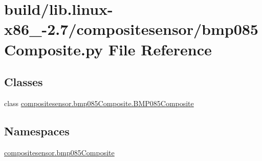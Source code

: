 \hypertarget{build_2lib_8linux-x86__64-2_87_2compositesensor_2bmp085Composite_8py}{}\section{build/lib.linux-\/x86\+\_-\/2.7/compositesensor/bmp085\+Composite.py File Reference}
\label{build_2lib_8linux-x86__64-2_87_2compositesensor_2bmp085Composite_8py}
\subsection*{Classes}
\begin{DoxyCompactItemize}
\item 
class \hyperlink{classcompositesensor_1_1bmp085Composite_1_1BMP085Composite}{compositesensor.\+bmp085\+Composite.\+B\+M\+P085\+Composite}
\end{DoxyCompactItemize}
\subsection*{Namespaces}
\begin{DoxyCompactItemize}
\item 
 \hyperlink{namespacecompositesensor_1_1bmp085Composite}{compositesensor.\+bmp085\+Composite}
\end{DoxyCompactItemize}
